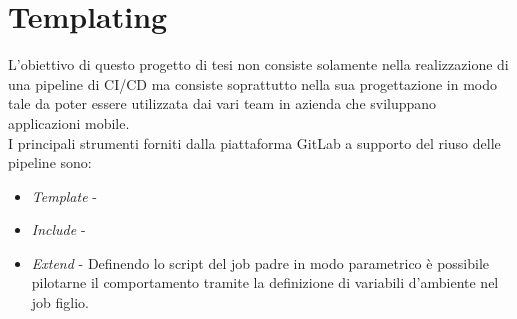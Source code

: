 \section{Templating}
L'obiettivo di questo progetto di tesi non consiste solamente nella realizzazione di una pipeline di CI/CD ma consiste soprattutto nella sua progettazione in modo tale da poter essere utilizzata dai vari team in azienda che sviluppano applicazioni mobile.\\
I principali strumenti forniti dalla piattaforma GitLab a supporto del riuso delle pipeline sono:
\begin{itemize}
    \item \textit{Template} -
    \item \textit{Include} - 
    \item \textit{Extend} - Definendo lo script del job padre in modo parametrico è possibile pilotarne il comportamento tramite la definizione di variabili d'ambiente nel job figlio.
\end{itemize}